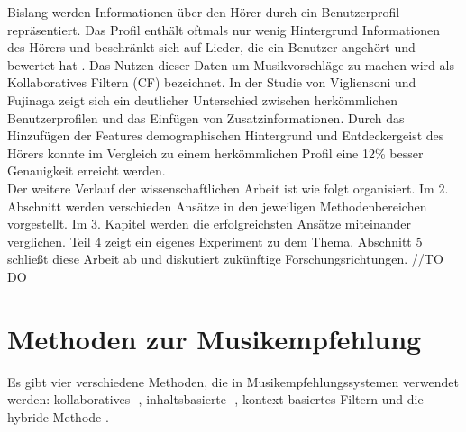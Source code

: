 \documentclass[twosided,a4,10pt]{article}
\begin{document}
\begin{multicols}{2}
Bislang werden Informationen über den Hörer durch ein Benutzerprofil repräsentiert. Das Profil enthält oftmals nur wenig Hintergrund Informationen des Hörers und beschränkt sich auf Lieder, die ein Benutzer angehört und bewertet hat \cite{oord}. Das Nutzen dieser Daten um Musikvorschläge zu machen wird als Kollaboratives Filtern (CF) bezeichnet. In der Studie von Vigliensoni und Fujinaga \cite{vigliensoni} zeigt sich ein deutlicher Unterschied zwischen herkömmlichen Benutzerprofilen und das Einfügen von Zusatzinformationen. Durch das Hinzufügen der Features demographischen Hintergrund und Entdeckergeist des Hörers konnte im Vergleich zu einem herkömmlichen Profil eine 12\% besser Genauigkeit erreicht werden.\newline\\
Der weitere Verlauf der wissenschaftlichen Arbeit ist wie folgt organisiert. Im 2. Abschnitt werden verschieden Ansätze in den jeweiligen Methodenbereichen vorgestellt. Im 3. Kapitel werden die erfolgreichsten Ansätze miteinander verglichen. Teil 4 zeigt ein eigenes Experiment zu dem Thema. Abschnitt 5 schließt diese Arbeit ab und diskutiert zukünftige Forschungsrichtungen. //TO DO

\section{Methoden zur Musikempfehlung}
Es gibt vier verschiedene Methoden, die in Musikempfehlungssystemen verwendet werden: kollaboratives -, inhaltsbasierte -, kontext-basiertes Filtern und die hybride Methode \cite{kaitila}.

\end{multicols}
\end{document}
